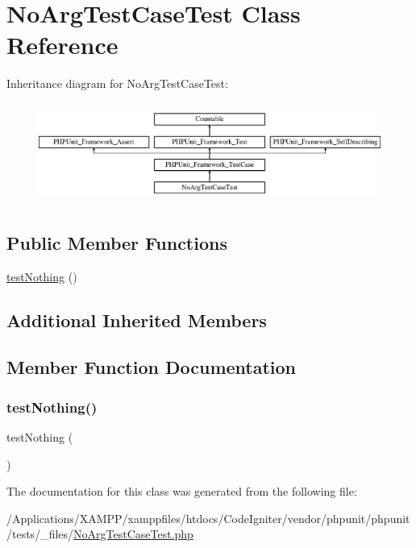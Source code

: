 \hypertarget{class_no_arg_test_case_test}{}\section{No\+Arg\+Test\+Case\+Test Class Reference}
\label{class_no_arg_test_case_test}
Inheritance diagram for No\+Arg\+Test\+Case\+Test\+:\begin{figure}[H]
\begin{center}
\leavevmode
\includegraphics[height=3.303835cm]{class_no_arg_test_case_test}
\end{center}
\end{figure}
\subsection*{Public Member Functions}
\begin{DoxyCompactItemize}
\item 
\mbox{\hyperlink{class_no_arg_test_case_test_aaf50ae2758b5dfb45e08bdd224170d8e}{test\+Nothing}} ()
\end{DoxyCompactItemize}
\subsection*{Additional Inherited Members}


\subsection{Member Function Documentation}
\mbox{\label{class_no_arg_test_case_test_aaf50ae2758b5dfb45e08bdd224170d8e}} 
\subsubsection{\texorpdfstring{test\+Nothing()}{testNothing()}}
{\footnotesize\ttfamily test\+Nothing (\begin{DoxyParamCaption}{ }\end{DoxyParamCaption})}



The documentation for this class was generated from the following file\+:\begin{DoxyCompactItemize}
\item 
/\+Applications/\+X\+A\+M\+P\+P/xamppfiles/htdocs/\+Code\+Igniter/vendor/phpunit/phpunit/tests/\+\_\+files/\mbox{\hyperlink{_no_arg_test_case_test_8php}{No\+Arg\+Test\+Case\+Test.\+php}}\end{DoxyCompactItemize}
